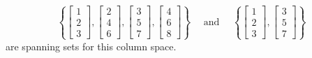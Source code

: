 \documentclass{ximera}
\begin{document}
\begin{equation*}
    \left\{
    \begin{bmatrix}
        1 \\
        2 \\
        3 
    \end{bmatrix}
    ,
    \begin{bmatrix}
        2 \\
        4 \\
        6
    \end{bmatrix}
    ,
    \begin{bmatrix}
        3 \\
        5 \\
        7
    \end{bmatrix}
    ,
    \begin{bmatrix}
        4 \\
        6 \\
        8
    \end{bmatrix}
    \right\} \quad \text{ and } \quad  \left\{
    \begin{bmatrix}
        1 \\
        2 \\
        3
    \end{bmatrix}
    ,
    \begin{bmatrix}
        3 \\
        5 \\
        7
    \end{bmatrix}
    \right\} 
\end{equation*} 
are spanning sets for this column space.
\end{document}

